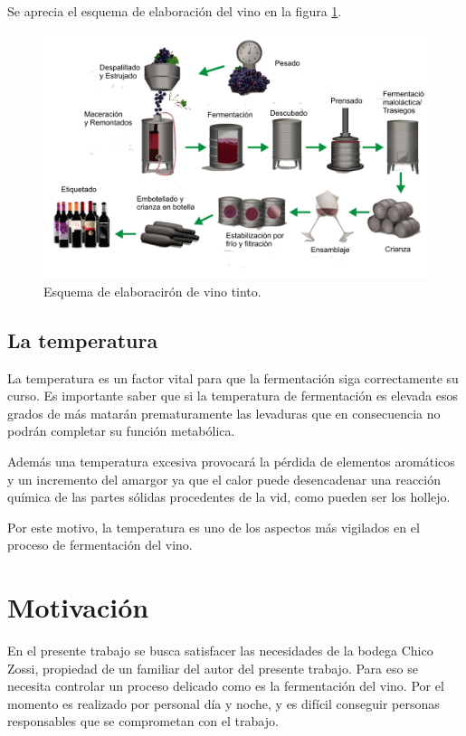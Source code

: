 Se aprecia el esquema de elaboración del vino en la figura \ref{fig:winep}.

\begin{figure}[hp]
  \centering
  \includegraphics[scale=.3]{./Figures/elaboracion-del-vino-tinto.png}
  \caption{Esquema de elaboracirón de vino tinto.}
  \label{fig:winep}
\end{figure}


\subsection{La temperatura}

  La temperatura es un factor vital para que la fermentación siga correctamente su curso. Es importante saber que si la temperatura de fermentación es elevada esos grados de más matarán prematuramente las levaduras que en consecuencia no podrán completar su función metabólica.

 Además una temperatura excesiva provocará la pérdida de elementos aromáticos y un incremento del amargor ya que el calor puede desencadenar una reacción química de las partes sólidas procedentes de la vid, como pueden ser los hollejo.

  Por este motivo, la temperatura es uno de los aspectos más vigilados en el proceso de fermentación del vino. 


\section{Motivación}

En el presente trabajo se busca satisfacer las necesidades de la bodega Chico Zossi, propiedad de un familiar del autor del presente trabajo.
Para eso se necesita controlar un proceso delicado como es la fermentación del vino. Por el momento es realizado por personal día y noche, y es difícil conseguir personas responsables que se comprometan con el trabajo. 

